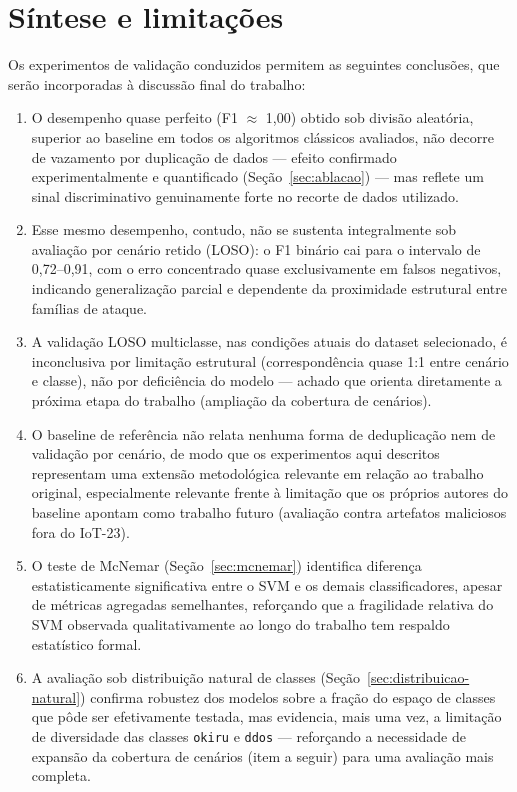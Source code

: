 \section{Síntese e limitações}
\label{sec:sintese-limitacoes}

Os experimentos de validação conduzidos permitem as seguintes conclusões, que serão incorporadas à discussão final do trabalho:

\begin{enumerate}
    \item O desempenho quase perfeito (F1 $\approx$ 1{,}00) obtido sob divisão aleatória, superior ao baseline em todos os algoritmos clássicos avaliados, não decorre de vazamento por duplicação de dados — efeito confirmado experimentalmente e quantificado (Seção~\ref{sec:ablacao}) — mas reflete um sinal discriminativo genuinamente forte no recorte de dados utilizado.
    \item Esse mesmo desempenho, contudo, não se sustenta integralmente sob avaliação por cenário retido (LOSO): o F1 binário cai para o intervalo de 0{,}72–0{,}91, com o erro concentrado quase exclusivamente em falsos negativos, indicando generalização parcial e dependente da proximidade estrutural entre famílias de ataque.
    \item A validação LOSO multiclasse, nas condições atuais do dataset selecionado, é inconclusiva por limitação estrutural (correspondência quase 1:1 entre cenário e classe), não por deficiência do modelo — achado que orienta diretamente a próxima etapa do trabalho (ampliação da cobertura de cenários).
    \item O baseline de referência não relata nenhuma forma de deduplicação nem de validação por cenário, de modo que os experimentos aqui descritos representam uma extensão metodológica relevante em relação ao trabalho original, especialmente relevante frente à limitação que os próprios autores do baseline apontam como trabalho futuro (avaliação contra artefatos maliciosos fora do IoT-23).
    \item O teste de McNemar (Seção~\ref{sec:mcnemar}) identifica diferença estatisticamente significativa entre o SVM e os demais classificadores, apesar de métricas agregadas semelhantes, reforçando que a fragilidade relativa do SVM observada qualitativamente ao longo do trabalho tem respaldo estatístico formal.
    \item A avaliação sob distribuição natural de classes (Seção~\ref{sec:distribuicao-natural}) confirma robustez dos modelos sobre a fração do espaço de classes que pôde ser efetivamente testada, mas evidencia, mais uma vez, a limitação de diversidade das classes \texttt{okiru} e \texttt{ddos} — reforçando a necessidade de expansão da cobertura de cenários (item a seguir) para uma avaliação mais completa.
\end{enumerate}

